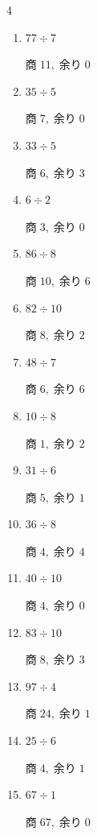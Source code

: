 \begin{multicols}{4}
\begin{enumerate}
\columnbreak %

  \item $77 \div 7$

        $商\; 11,\; 余り\; 0$

  \item $35 \div 5$

        $商\; 7,\; 余り\; 0$

  \item $33 \div 5$

        $商\; 6,\; 余り\; 3$

  \item $6 \div 2$

        $商\; 3,\; 余り\; 0$

  \item $86 \div 8$

        $商\; 10,\; 余り\; 6$

  \item $82 \div 10$

        $商\; 8,\; 余り\; 2$

  \item $48 \div 7$

        $商\; 6,\; 余り\; 6$

  \item $10 \div 8$

        $商\; 1,\; 余り\; 2$

  \item $31 \div 6$

        $商\; 5,\; 余り\; 1$

  \item $36 \div 8$

        $商\; 4,\; 余り\; 4$

  \item $40 \div 10$

        $商\; 4,\; 余り\; 0$

  \item $83 \div 10$

        $商\; 8,\; 余り\; 3$

  \item $97 \div 4$

        $商\; 24,\; 余り\; 1$

  \item $25 \div 6$

        $商\; 4,\; 余り\; 1$

  \item $67 \div 1$

        $商\; 67,\; 余り\; 0$


\end{enumerate}
\end{multicols}
